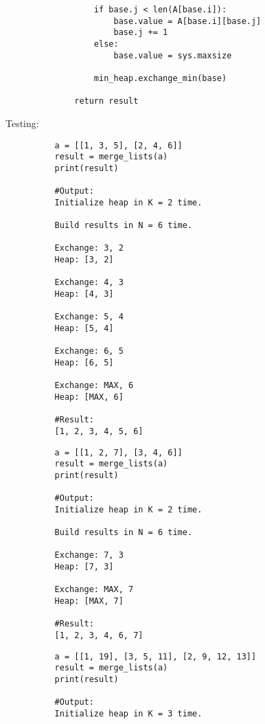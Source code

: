 \documentclass{article}
\begin{document}
\begin{enumerate}
\begin{lstlisting}
                  if base.j < len(A[base.i]): 
                      base.value = A[base.i][base.j] 
                      base.j += 1
                  else: 
                      base.value = sys.maxsize 
                      
                  min_heap.exchange_min(base)
                  
              return result
        \end{lstlisting}

        Testing:
        
        \begin{lstlisting}
          a = [[1, 3, 5], [2, 4, 6]]
          result = merge_lists(a)          
          print(result)

          #Output:
          Initialize heap in K = 2 time.

          Build results in N = 6 time.

          Exchange: 3, 2
          Heap: [3, 2]

          Exchange: 4, 3
          Heap: [4, 3]

          Exchange: 5, 4
          Heap: [5, 4]

          Exchange: 6, 5
          Heap: [6, 5]

          Exchange: MAX, 6
          Heap: [MAX, 6]

          #Result:
          [1, 2, 3, 4, 5, 6]
        \end{lstlisting}


        \begin{lstlisting}
          a = [[1, 2, 7], [3, 4, 6]]
          result = merge_lists(a)
          print(result)

          #Output:
          Initialize heap in K = 2 time.

          Build results in N = 6 time.

          Exchange: 7, 3
          Heap: [7, 3]

          Exchange: MAX, 7
          Heap: [MAX, 7]

          #Result:
          [1, 2, 3, 4, 6, 7]
        \end{lstlisting}

        \begin{lstlisting}
          a = [[1, 19], [3, 5, 11], [2, 9, 12, 13]]
          result = merge_lists(a)          
          print(result)

          #Output:
          Initialize heap in K = 3 time.


\end{lstlisting}
\end{enumerate}
\end{document}
